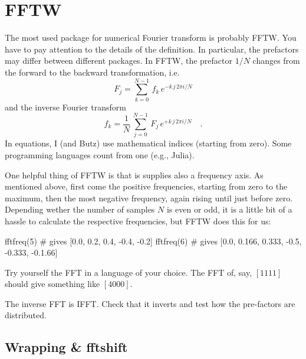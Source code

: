 \section{FFTW}

The most used package for numerical Fourier transform is probably FFTW. You have to pay attention to the details of the definition. In particular, the prefactors may differ between different packages. In FFTW, the prefactor $1/N$ changes from the forward to the backward transformation, i.e.
%
\begin{equation}
 F_j =   \sum_{k=0}^{N-1} \, f_k \, e^{- k \, j \, 2 \pi i / N } 
\end{equation}
%
and the inverse Fourier transform
%
\begin{equation}
f_k =  \frac{1}{N} \, \sum_{j=0}^{N-1} \, F_j \, e^{+ k \,  j \, 2 \pi i / N } \quad .
\end{equation}
In equations, I (and Butz) use mathematical indices (starting from zero).
Some programming languages count from one (e.g., Julia).

One helpful thing of FFTW is that is supplies also a frequency axis. As mentioned above, first come the positive frequencies, starting from zero to the maximum, then the most negative frequency, again rising until just before zero. 
Depending wether the number of samples $N$ is  even or odd, it is a little bit of a hassle 
to calculate the respective frequencies, but FFTW   does this for us:
\begin{jllisting}
  fftfreq(5) # gives [0.0, 0.2, 0.4, -0.4, -0.2]
  fftfreq(6) # gives [0.0, 0.166, 0.333, -0.5, -0.333, -0.1.66]
\end{jllisting}

\begin{questions}
  \item Try yourself the FFT in a language of your choice. The FFT of, say, $[1 1 1 1]$ should give something like $[4 0 0 0 ]$. 
  \item The inverse FFT is IFFT. Check that it inverts and test how the pre-factors are distributed.
\end{questions}



\subsection{Wrapping \& fftshift}

